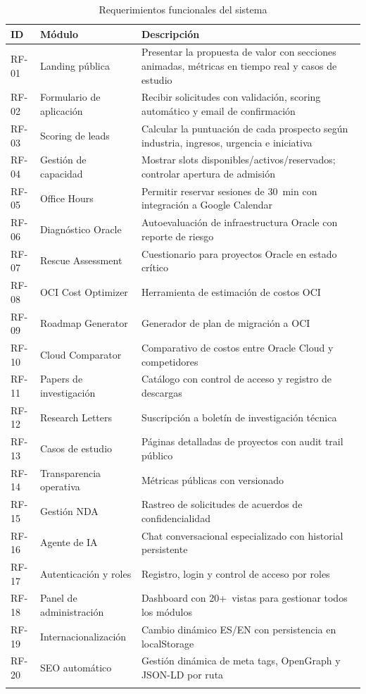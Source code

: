 \documentclass[12pt, a4paper, twoside]{report}
\begin{document}
\begin{center}
\begin{longtable}{C{1.4cm} L{3.5cm} L{8.5cm}}
  \toprule
  \textbf{ID} & \textbf{Módulo} & \textbf{Descripción} \\
  \midrule
  \endhead
  RF-01 & Landing pública & Presentar la propuesta de valor con secciones animadas, métricas en tiempo real y casos de estudio \\[4pt]
  RF-02 & Formulario de aplicación & Recibir solicitudes con validación, scoring automático y email de confirmación \\[4pt]
  RF-03 & Scoring de leads & Calcular la puntuación de cada prospecto según industria, ingresos, urgencia e iniciativa \\[4pt]
  RF-04 & Gestión de capacidad & Mostrar slots disponibles/activos/reservados; controlar apertura de admisión \\[4pt]
  RF-05 & Office Hours & Permitir reservar sesiones de 30~min con integración a Google Calendar \\[4pt]
  RF-06 & Diagnóstico Oracle & Autoevaluación de infraestructura Oracle con reporte de riesgo \\[4pt]
  RF-07 & Rescue Assessment & Cuestionario para proyectos Oracle en estado crítico \\[4pt]
  RF-08 & OCI Cost Optimizer & Herramienta de estimación de costos OCI \\[4pt]
  RF-09 & Roadmap Generator & Generador de plan de migración a OCI \\[4pt]
  RF-10 & Cloud Comparator & Comparativo de costos entre Oracle Cloud y competidores \\[4pt]
  RF-11 & Papers de investigación & Catálogo con control de acceso y registro de descargas \\[4pt]
  RF-12 & Research Letters & Suscripción a boletín de investigación técnica \\[4pt]
  RF-13 & Casos de estudio & Páginas detalladas de proyectos con audit trail público \\[4pt]
  RF-14 & Transparencia operativa & Métricas públicas con versionado \\[4pt]
  RF-15 & Gestión NDA & Rastreo de solicitudes de acuerdos de confidencialidad \\[4pt]
  RF-16 & Agente de IA & Chat conversacional especializado con historial persistente \\[4pt]
  RF-17 & Autenticación y roles & Registro, login y control de acceso por roles \\[4pt]
  RF-18 & Panel de administración & Dashboard con 20+~vistas para gestionar todos los módulos \\[4pt]
  RF-19 & Internacionalización & Cambio dinámico ES/EN con persistencia en localStorage \\[4pt]
  RF-20 & SEO automático & Gestión dinámica de meta tags, OpenGraph y JSON-LD por ruta \\
  \bottomrule
  \caption{Requerimientos funcionales del sistema}
\end{longtable}
\end{center}
\end{document}
